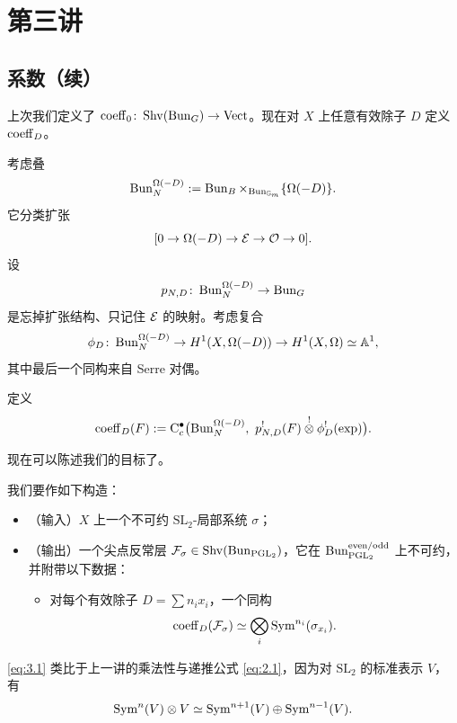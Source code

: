 \section{第三讲}

\subsection{系数（续）}

上次我们定义了 \(\operatorname{coeff}_0\colon\operatorname{Shv}(\operatorname{Bun}_G)\to\mathrm{Vect}\)。现在对 \(X\) 上任意有效除子 \(D\) 定义 \(\operatorname{coeff}_D\)。

考虑叠
\[
\operatorname{Bun}^{\Omega(-D)}_N:=\operatorname{Bun}_B\times_{\operatorname{Bun}_{\mathbb{G}_m}}\{\Omega(-D)\}.
\]
它分类扩张
\[
[0\to\Omega(-D)\to\mathcal{E}\to\mathcal{O}\to 0].
\]
设
\[
p_{N,D}\colon\operatorname{Bun}^{\Omega(-D)}_N\to\operatorname{Bun}_G
\]
是忘掉扩张结构、只记住 \(\mathcal{E}\) 的映射。考虑复合
\[
\phi_D\colon\operatorname{Bun}^{\Omega(-D)}_N\to H^1(X,\Omega(-D))\to H^1(X,\Omega)\simeq\mathbb{A}^1,
\]
其中最后一个同构来自 Serre 对偶。

\begin{definition}\label{def:coeffD}
定义
\[
\coeff_D(F):=\mathrm{C}^\bullet_c\bigl(\Bun^{\Omega(-D)}_N,\ p_{N,D}^!(F)\overset{!}{\otimes}\phi_D^!(\exp)\bigr).
\]
\end{definition}

现在可以陈述我们的目标了。

\begin{goal}\label{goal:main}
我们要作如下构造：

\begin{itemize}
\item （输入）\(X\) 上一个不可约 \(\mathrm{SL}_2\)-局部系统 \(\sigma\)；
\item （输出）一个尖点反常层 \(\mathcal{F}_\sigma\in\operatorname{Shv}(\operatorname{Bun}_{\mathrm{PGL}_2})\)，它在
\(\operatorname{Bun}^{\mathrm{even}/\mathrm{odd}}_{\mathrm{PGL}_2}\) 上不可约，并附带以下数据：
\begin{itemize}
\item 对每个有效除子 \(D=\sum n_i x_i\)，一个同构
\begin{equation}\label{eq:3.1}
\operatorname{coeff}_D(\mathcal{F}_\sigma)\simeq\bigotimes_i\operatorname{Sym}^{n_i}(\sigma_{x_i}).
\end{equation}
\end{itemize}
\end{itemize}
\end{goal}

\begin{remark}\label{rem:recursion}
\eqref{eq:3.1} 类比于上一讲的乘法性与递推公式 \eqref{eq:2.1}，因为对 \(\mathrm{SL}_2\) 的标准表示 \(V\)，有
\[
\operatorname{Sym}^n(V)\otimes V\simeq\operatorname{Sym}^{n+1}(V)\oplus\operatorname{Sym}^{n-1}(V).
\]
\end{remark}

